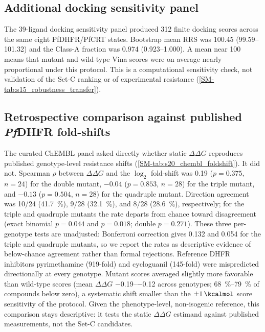 \documentclass[11pt,a4paper]{article}
\begin{document}
\subsection{Additional docking sensitivity panel}

The 39-ligand docking sensitivity panel produced \num{312} finite docking scores across the same eight PfDHFR/PfCRT states. Bootstrap mean RRS was \num{100.45} (\numrange{99.59}{101.32}) and the Class-A fraction was \num{0.974} (\numrange{0.923}{1.000}). A mean near \num{100} means that mutant and wild-type Vina scores were on average nearly proportional under this protocol. This is a computational sensitivity check, not validation of the Set-C ranking or of experimental resistance (\cref{SM-tab:s15_robustness_transfer}).

\subsection{Retrospective comparison against published \textit{Pf}DHFR fold-shifts}

The curated ChEMBL panel asked directly whether static $\Delta\Delta G$ reproduces published genotype-level resistance shifts (\cref{SM-tab:s20_chembl_foldshift}). It did not. Spearman $\rho$ between $\Delta\Delta G$ and the $\log_2$ fold-shift was \num{0.19} ($p=\num{0.375}$, $n=\num{24}$) for the double mutant, $-\num{0.04}$ ($p=\num{0.853}$, $n=\num{28}$) for the triple mutant, and $-\num{0.13}$ ($p=\num{0.504}$, $n=\num{28}$) for the quadruple mutant. Direction agreement was \num{10}/\num{24} (\qty{41.7}{\percent}), \num{9}/\num{28} (\qty{32.1}{\percent}), and \num{8}/\num{28} (\qty{28.6}{\percent}), respectively; for the triple and quadruple mutants the rate departs from chance toward disagreement (exact binomial $p=\num{0.044}$ and $p=\num{0.018}$; double $p=\num{0.271}$). These three per-genotype tests are unadjusted: Bonferroni correction gives \num{0.132} and \num{0.054} for the triple and quadruple mutants, so we report the rates as descriptive evidence of below-chance agreement rather than formal rejections. Reference DHFR inhibitors pyrimethamine (\num{919}-fold) and cycloguanil (\num{145}-fold) were mispredicted directionally at every genotype. Mutant scores averaged slightly more favorable than wild-type scores (mean $\Delta\Delta G$ \qtyrange{-0.19}{-0.12}{\kcalmol} across genotypes; \qtyrange{68}{79}{\percent} of compounds below zero), a systematic shift smaller than the $\pm\qty{1}{\kcalmol}$ score sensitivity of the protocol. Given the phenotype-level, non-isogenic reference, this comparison stays descriptive: it tests the static $\Delta\Delta G$ estimand against published measurements, not the Set-C candidates.
\end{document}
